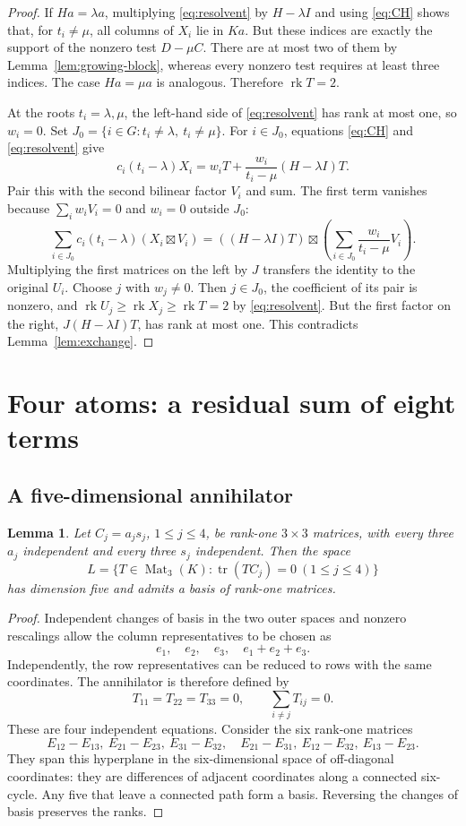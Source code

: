 \documentclass[11pt,a4paper]{article}
\numberwithin{equation}{section}
\theoremstyle{plain}
\newtheorem{lemma}[theorem]{Lemma}
\theoremstyle{definition}
\DeclareMathOperator{\tr}{tr}\DeclareMathOperator{\rk}{rk}
\DeclareMathOperator{\Mat}{Mat}\DeclareMathOperator{\Span}{span}
\newcommand{\leqs}{\leqslant}\newcommand{\geqs}{\geqslant}
\begin{document}
\begin{proof}
If $Ha=\lambda a$, multiplying \eqref{eq:resolvent} by $H-\lambda I$
and using \eqref{eq:CH} shows that, for $t_i\ne\mu$, all columns of
$X_i$ lie in $Ka$. But these indices are exactly the support of the
nonzero test $D-\mu C$. There are at most two of them by
Lemma~\ref{lem:growing-block}, whereas every nonzero test requires at
least three indices. The case $Ha=\mu a$ is analogous.
Therefore $\rk T=2$.

At the roots $t_i=\lambda,\mu$, the left-hand side of
\eqref{eq:resolvent} has rank at most one, so $w_i=0$.
Set $J_0=\{i\in G:t_i\ne\lambda,\ t_i\ne\mu\}$.
For $i\in J_0$, equations \eqref{eq:CH} and \eqref{eq:resolvent} give
\[
 c_i(t_i-\lambda)X_i
 =w_iT+\frac{w_i}{t_i-\mu}(H-\lambda I)T.
\]
Pair this with the second bilinear factor $V_i$ and sum.
The first term vanishes because $\sum_iw_iV_i=0$ and $w_i=0$
outside $J_0$:
\[
 \sum_{i\in J_0}c_i(t_i-\lambda)(X_i\boxtimes V_i)
 =((H-\lambda I)T)\boxtimes
     \left(\sum_{i\in J_0}\frac{w_i}{t_i-\mu}V_i\right).
\]
Multiplying the first matrices on the left by $J$ transfers the
identity to the original $U_i$. Choose $j$ with $w_j\ne0$.
Then $j\in J_0$, the coefficient of its pair is nonzero, and
$\rk U_j\geqs\rk X_j\geqs\rk T=2$ by \eqref{eq:resolvent}.
But the first factor on the right, $J(H-\lambda I)T$, has rank at
most one. This contradicts Lemma~\ref{lem:exchange}.
\end{proof}

\section{Four atoms: a residual sum of eight terms}

\subsection{A five-dimensional annihilator}

\begin{lemma}\label{lem:annihilator}
Let $C_j=a_js_j$, $1\leqs j\leqs4$, be rank-one $3\times3$ matrices,
with every three $a_j$ independent and every three $s_j$ independent.
Then the space
\[
 L=\{T\in\Mat_3(K):\tr(TC_j)=0\ (1\leqs j\leqs4)\}
\]
has dimension five and admits a basis of rank-one matrices.
\end{lemma}
\begin{proof}
Independent changes of basis in the two outer spaces and nonzero
rescalings allow the column representatives to be chosen as
\[
 e_1,\quad e_2,\quad e_3,\quad e_1+e_2+e_3.
\]
Independently, the row representatives can be reduced to rows with
the same coordinates. The annihilator is therefore defined by
\[
 T_{11}=T_{22}=T_{33}=0,\qquad \sum_{i\ne j}T_{ij}=0.
\]
These are four independent equations. Consider the six rank-one matrices
\[
 E_{12}-E_{13},\ E_{21}-E_{23},\ E_{31}-E_{32},\quad
 E_{21}-E_{31},\ E_{12}-E_{32},\ E_{13}-E_{23}.
\]
They span this hyperplane in the six-dimensional space of off-diagonal
coordinates: they are differences of adjacent coordinates along a
connected six-cycle. Any five that leave a connected path form a basis.
Reversing the changes of basis preserves the ranks.
\end{proof}
\end{document}
